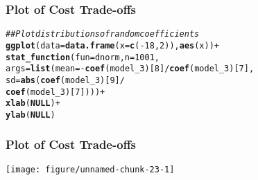 \documentclass{beamer}\usepackage[]{graphicx}\usepackage[]{color}
\makeatletter
\def\maxwidth{ %
  \ifdim\Gin@nat@width>\linewidth
    \linewidth
  \else
    \Gin@nat@width
  \fi
}
\newcommand{\hlnum}[1]{\textcolor[rgb]{0.686,0.059,0.569}{#1}}%
\newcommand{\hlcom}[1]{\textcolor[rgb]{0.678,0.584,0.686}{\textit{#1}}}%
\newcommand{\hlopt}[1]{\textcolor[rgb]{0,0,0}{#1}}%
\newcommand{\hlstd}[1]{\textcolor[rgb]{0.345,0.345,0.345}{#1}}%
\newcommand{\hlkwa}[1]{\textcolor[rgb]{0.161,0.373,0.58}{\textbf{#1}}}%
\newcommand{\hlkwc}[1]{\textcolor[rgb]{0.333,0.667,0.333}{#1}}%
\newcommand{\hlkwd}[1]{\textcolor[rgb]{0.737,0.353,0.396}{\textbf{#1}}}%
\newenvironment{kframe}{%
 \def\at@end@of@kframe{}%
 \ifinner\ifhmode%
  \def\at@end@of@kframe{\end{minipage}}%
  \begin{minipage}{\columnwidth}%
 \fi\fi%
 \def\FrameCommand##1{\hskip\@totalleftmargin \hskip-\fboxsep
 \colorbox{shadecolor}{##1}\hskip-\fboxsep
     \hskip-\linewidth \hskip-\@totalleftmargin \hskip\columnwidth}%
 \MakeFramed {\advance\hsize-\width
   \@totalleftmargin\z@ \linewidth\hsize
   \@setminipage}}%
 {\par\unskip\endMakeFramed%
 \at@end@of@kframe}
\newenvironment{knitrout}{}{} %
\makeatother
\begin{document}
\begin{frame}[fragile]\frametitle{Plot of Cost Trade-offs}
\begin{knitrout}\footnotesize
{}\color{fgcolor}\begin{kframe}
\begin{alltt}
\hlcom{## Plot distributions of random coefficients}
\hlkwd{ggplot}\hlstd{(}\hlkwc{data} \hlstd{=} \hlkwd{data.frame}\hlstd{(}\hlkwc{x} \hlstd{=} \hlkwd{c}\hlstd{(}\hlopt{-}\hlnum{18}\hlstd{,} \hlnum{2}\hlstd{)),} \hlkwd{aes}\hlstd{(x))} \hlopt{+}
  \hlkwd{stat_function}\hlstd{(}\hlkwc{fun} \hlstd{= dnorm,} \hlkwc{n} \hlstd{=} \hlnum{1001}\hlstd{,}
                \hlkwc{args} \hlstd{=} \hlkwd{list}\hlstd{(}\hlkwc{mean} \hlstd{=} \hlopt{-}\hlkwd{coef}\hlstd{(model_3)[}\hlnum{8}\hlstd{]} \hlopt{/} \hlkwd{coef}\hlstd{(model_3)[}\hlnum{7}\hlstd{],}
                            \hlkwc{sd} \hlstd{=} \hlkwd{abs}\hlstd{(}\hlkwd{coef}\hlstd{(model_3)[}\hlnum{9}\hlstd{]} \hlopt{/}
                                       \hlkwd{coef}\hlstd{(model_3)[}\hlnum{7}\hlstd{])))} \hlopt{+}
  \hlkwd{xlab}\hlstd{(}\hlkwa{NULL}\hlstd{)} \hlopt{+}
  \hlkwd{ylab}\hlstd{(}\hlkwa{NULL}\hlstd{)}
\end{alltt}
\end{kframe}
\end{knitrout}
\end{frame}

\begin{frame}[fragile]\frametitle{Plot of Cost Trade-offs}
\begin{knitrout}\footnotesize
{}\color{fgcolor}

{\centering \texttt{[image: figure/unnamed-chunk-23-1]} 

}


\end{knitrout}
\end{frame}
\end{document}
